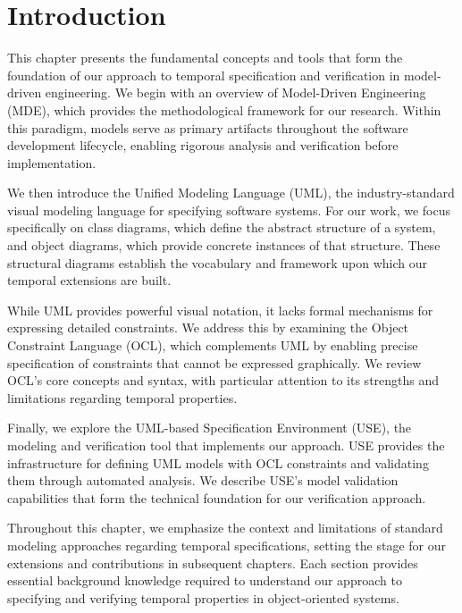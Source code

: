 \setlength{\parindent}{1cm}

\section{Introduction}

\hspace{1cm} This chapter presents the fundamental concepts and tools that form the 
foundation of our approach to temporal specification and verification in model-driven 
engineering. We begin with an overview of Model-Driven Engineering (MDE), which 
provides the methodological framework for our research. Within this paradigm, models 
serve as primary artifacts throughout the software development lifecycle, enabling 
rigorous analysis and verification before implementation.

We then introduce the Unified Modeling Language (UML), the industry-standard visual 
modeling language for specifying software systems. For our work, we focus specifically 
on class diagrams, which define the abstract structure of a system, and object 
diagrams, which provide concrete instances of that structure. These structural 
diagrams establish the vocabulary and framework upon which our temporal extensions 
are built.

While UML provides powerful visual notation, it lacks formal mechanisms for expressing 
detailed constraints. We address this by examining the Object Constraint Language (OCL), 
which complements UML by enabling precise specification of constraints that cannot 
be expressed graphically. We review OCL's core concepts and syntax, with particular 
attention to its strengths and limitations regarding temporal properties.

Finally, we explore the UML-based Specification Environment (USE), the modeling and 
verification tool that implements our approach. USE provides the infrastructure for 
defining UML models with OCL constraints and validating them through automated 
analysis. We describe USE's model validation capabilities that form the technical 
foundation for our verification approach.

Throughout this chapter, we emphasize the context and limitations of standard 
modeling approaches regarding temporal specifications, setting the stage for our 
extensions and contributions in subsequent chapters. Each section provides essential 
background knowledge required to understand our approach to specifying and verifying 
temporal properties in object-oriented systems.
